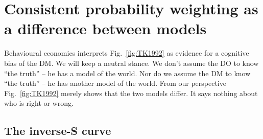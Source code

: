 \documentclass[a4paper, 12pt]{article}
\newcommand{\fref}[1]{Fig.~\ref{fig:#1}}
\newcommand{\seclabel}[1]{\label{sec:#1}}
\newcommand{\MK}[1]{{\it ***MK: #1 MK***}}
\begin{document}


\section{Consistent probability weighting as a difference between models} \seclabel{ModelDiff}

Behavioural economics interprets \fref{TK1992} as evidence for a cognitive bias of the DM. We will keep a neutral stance. We don't assume the DO to know ``the truth'' -- he has a model of the world. Nor do we assume the DM to know ``the truth'' -- he has another model of the world. From our perspective \fref{TK1992} merely shows that the two models differ. It says nothing about who is right or wrong.



\subsection{The inverse-S curve\seclabel{The_inverse}}
\end{document}
